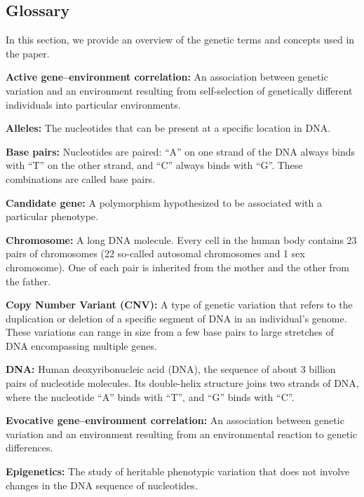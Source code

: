 \documentclass[12pt,a4paper]{article}
\begin{document}
\begin{bibunit}

\renewcommand{\thetable}{A.\arabic{table}}
\renewcommand{\thefigure}{A.\arabic{figure}}
\renewcommand{\theequation}{A.\arabic{equation}}
\setcounter{table}{0} 
\setcounter{figure}{0} 
\setcounter{equation}{0} 

\section{Glossary}
\label{appsec:glossary}

In this section, we provide an overview of the genetic terms and concepts used in the paper. 

\bigskip 
\textbf{Active gene--environment correlation:} An association between genetic variation and an environment resulting from self-selection of genetically different individuals into particular environments.

\textbf{Alleles:} The nucleotides that can be present at a specific location in DNA.

\textbf{Base pairs:} Nucleotides are paired: ``A'' on one strand of the DNA always binds with ``T'' on the other strand, and ``C'' always binds with ``G''. These combinations are called base pairs.

\textbf{Candidate gene:} A polymorphism hypothesized to be associated with a particular phenotype.

\textbf{Chromosome:} A long DNA molecule. Every cell in the human body contains 23 pairs of chromosomes (22 so-called autosomal chromosomes and 1 sex chromosome). One of each pair is inherited from the mother and the other from the father.

\textbf{Copy Number Variant (CNV):} A type of genetic variation that refers to the duplication or deletion of a specific segment of DNA in an individual's genome. These variations can range in size from a few base pairs to large stretches of DNA encompassing multiple genes. 

\textbf{DNA:} Human deoxyribonucleic acid (DNA), the sequence of about 3 billion pairs of nucleotide molecules. Its double-helix structure joins two strands of DNA, where the nucleotide ``A'' binds with ``T'', and ``G'' binds with ``C''.

\textbf{Evocative gene--environment correlation:} An association between genetic variation and an environment resulting from an environmental reaction to genetic differences.

\textbf{Epigenetics:} The study of heritable phenotypic variation that does not involve changes in the DNA sequence of nucleotides.


\end{bibunit}
\end{document}

